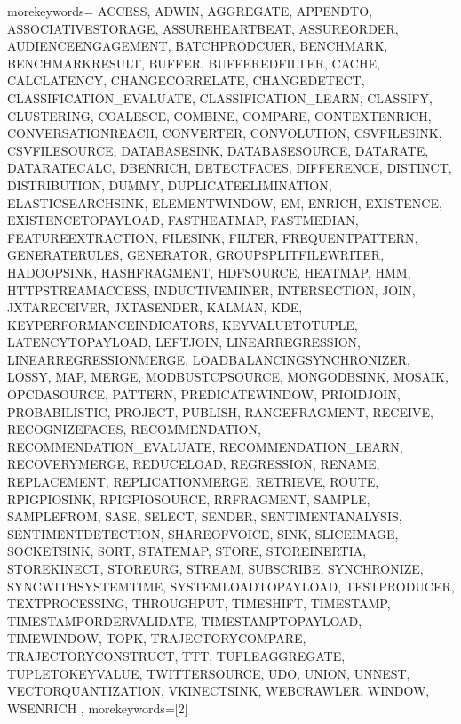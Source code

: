 
%
   {morekeywords={%
ACCESS, ADWIN, AGGREGATE, APPENDTO, ASSOCIATIVESTORAGE, ASSUREHEARTBEAT, ASSUREORDER, AUDIENCEENGAGEMENT, BATCHPRODCUER, BENCHMARK, BENCHMARKRESULT, BUFFER, BUFFEREDFILTER, CACHE, CALCLATENCY, CHANGECORRELATE, CHANGEDETECT, CLASSIFICATION_EVALUATE, CLASSIFICATION_LEARN, CLASSIFY, CLUSTERING, COALESCE, COMBINE, COMPARE, CONTEXTENRICH, CONVERSATIONREACH, CONVERTER, CONVOLUTION, CSVFILESINK, CSVFILESOURCE, DATABASESINK, DATABASESOURCE, DATARATE, DATARATECALC, DBENRICH, DETECTFACES, DIFFERENCE, DISTINCT, DISTRIBUTION, DUMMY, DUPLICATEELIMINATION, ELASTICSEARCHSINK, ELEMENTWINDOW, EM, ENRICH, EXISTENCE, EXISTENCETOPAYLOAD, FASTHEATMAP, FASTMEDIAN, FEATUREEXTRACTION, FILESINK, FILTER, FREQUENTPATTERN, GENERATERULES, GENERATOR, GROUPSPLITFILEWRITER, HADOOPSINK, HASHFRAGMENT, HDFSOURCE, HEATMAP, HMM, HTTPSTREAMACCESS, INDUCTIVEMINER, INTERSECTION, JOIN, JXTARECEIVER, JXTASENDER, KALMAN, KDE, KEYPERFORMANCEINDICATORS, KEYVALUETOTUPLE, LATENCYTOPAYLOAD, LEFTJOIN, LINEARREGRESSION, LINEARREGRESSIONMERGE, LOADBALANCINGSYNCHRONIZER, LOSSY, MAP, MERGE, MODBUSTCPSOURCE, MONGODBSINK, MOSAIK, OPCDASOURCE, PATTERN, PREDICATEWINDOW, PRIOIDJOIN, PROBABILISTIC, PROJECT, PUBLISH, RANGEFRAGMENT, RECEIVE, RECOGNIZEFACES, RECOMMENDATION, RECOMMENDATION_EVALUATE, RECOMMENDATION_LEARN, RECOVERYMERGE, REDUCELOAD, REGRESSION, RENAME, REPLACEMENT, REPLICATIONMERGE, RETRIEVE, ROUTE, RPIGPIOSINK, RPIGPIOSOURCE, RRFRAGMENT, SAMPLE, SAMPLEFROM, SASE, SELECT, SENDER, SENTIMENTANALYSIS, SENTIMENTDETECTION, SHAREOFVOICE, SINK, SLICEIMAGE, SOCKETSINK, SORT, STATEMAP, STORE, STOREINERTIA, STOREKINECT, STOREURG, STREAM, SUBSCRIBE, SYNCHRONIZE, SYNCWITHSYSTEMTIME, SYSTEMLOADTOPAYLOAD, TESTPRODUCER, TEXTPROCESSING, THROUGHPUT, TIMESHIFT, TIMESTAMP, TIMESTAMPORDERVALIDATE, TIMESTAMPTOPAYLOAD, TIMEWINDOW, TOPK, TRAJECTORYCOMPARE, TRAJECTORYCONSTRUCT, TTT, TUPLEAGGREGATE, TUPLETOKEYVALUE, TWITTERSOURCE, UDO, UNION, UNNEST, VECTORQUANTIZATION, VKINECTSINK, WEBCRAWLER, WINDOW, WSENRICH%
      },%
   morekeywords=[2]{%
}}
